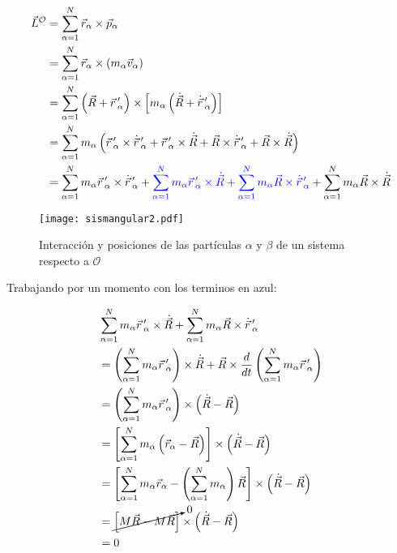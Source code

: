 \documentclass[/home/hernan-barquero/Documents/Apuntes_mecanica_teorica/main.tex]{subfiles}
\begin{document}
	\begin{align*}
		\vec{L}^{\mathcal{O}} &= \sum_{\alpha = 1}^{N} \vec{r}_{\alpha} \times \vec{p}_{\alpha} \\ 
							& = \sum_{\alpha = 1}^{N} \vec{r}_{\alpha} \times \left(m_{\alpha} \vec{v}_{\alpha} \right) \\ 
							& = \sum_{\alpha = 1}^{N} \left(\vec{R} + {\vec{r}}\,'_{\alpha} \right) \times \left[m_{\alpha} \left(\dot{\vec{R}} + {\dot{\vec{r}}}\,'_{\alpha} \right) \right] \\ 
							& = \sum_{\alpha =1}^{N} m_{\alpha} \left({\vec{r}}\,'_{\alpha} \times {\dot{\vec{r}}}\,'_{\alpha} + {\vec{r}}\,'_{\alpha} \times \dot{\vec{R}} + \vec{R} \times {\dot{\vec{r}}}\,'_{\alpha} + \vec{R} \times \dot{\vec{R}} \right) \\ 
							& =  \sum_{\alpha =1}^{N} m_{\alpha} {\vec{r}}\,'_{\alpha} \times {\dot{\vec{r}}}\,'_{\alpha} + \textcolor{blue}{\sum_{\alpha =1}^{N} m_{\alpha} {\vec{r}}\,'_{\alpha} \times \dot{\vec{R}} + \sum_{\alpha =1}^{N} m_{\alpha} \vec{R} \times {\dot{\vec{r}}}\,'_{\alpha}} + \sum_{\alpha =1}^{N} m_{\alpha}  \vec{R} \times \dot{\vec{R}}
	\end{align*}


	\begin{marginfigure}
		\begin{figure}[H]
			\texttt{[image: sismangular2.pdf]}
			\caption{Interacción y posiciones de las partículas $\alpha$ y $\beta$ de un sistema respecto a $\mathcal{O}$ }
			\label{fig: sismangular2}
		\end{figure}
	\end{marginfigure}

	Trabajando por un momento con los terminos en azul:

	\begin{align*}
		& \sum_{\alpha =1}^{N} m_{\alpha} {\vec{r}}\,'_{\alpha} \times \dot{\vec{R}} + \sum_{\alpha =1}^{N} m_{\alpha} \vec{R} \times {\dot{\vec{r}}}\,'_{\alpha} \\ 
		& = \left( \sum_{\alpha =1}^{N} m_{\alpha} {\vec{r}}\,'_{\alpha} \right) \times \dot{\vec{R}} + \vec{R} \times \frac{d}{dt} \left( \sum_{\alpha =1}^{N} m_{\alpha} {\vec{r}}\,'_{\alpha} \right) \\ 
		& = \left( \sum_{\alpha =1}^{N} m_{\alpha} {\vec{r}}\,'_{\alpha} \right) \times \left( \dot{\vec{R}}  - \vec{R}\right) \\ 
		& = \left[ \sum_{\alpha =1}^{N} m_{\alpha} \left(\vec{r}_{\alpha} - \vec{R} \right) \right] \times \left( \dot{\vec{R}}  - \vec{R}\right) \\ 
		& = \left[ \sum_{\alpha =1}^{N} m_{\alpha} \vec{r}_{\alpha} -\left( \sum_{\alpha =1}^{N} m_{\alpha} \right) \vec{R} \right] \times \left( \dot{\vec{R}}  - \vec{R}\right) \\ 
		& = \cancelto{0}{\left[M\vec{R}-M\vec{R}\right]} \times \left( \dot{\vec{R}}  - \vec{R}\right) \\ 
		& = 0
	\end{align*}
\end{document}
